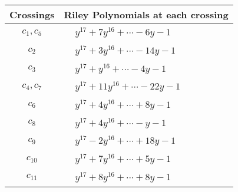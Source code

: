 \documentclass[1p]{elsarticle_modified}
\theoremstyle{definition}
\begin{document}
\begin{tabular}{m{50pt}|m{274pt}}
Crossings & \hspace{64pt}Riley Polynomials at each crossing \\
\hline $$\begin{aligned}c_{1},c_{5}\end{aligned}$$&$\begin{aligned}
&y^{17}+7 y^{16}+\cdots-6 y-1
\end{aligned}$\\
\hline $$\begin{aligned}c_{2}\end{aligned}$$&$\begin{aligned}
&y^{17}+3 y^{16}+\cdots-14 y-1
\end{aligned}$\\
\hline $$\begin{aligned}c_{3}\end{aligned}$$&$\begin{aligned}
&y^{17}+y^{16}+\cdots-4 y-1
\end{aligned}$\\
\hline $$\begin{aligned}c_{4},c_{7}\end{aligned}$$&$\begin{aligned}
&y^{17}+11 y^{16}+\cdots-22 y-1
\end{aligned}$\\
\hline $$\begin{aligned}c_{6}\end{aligned}$$&$\begin{aligned}
&y^{17}+4 y^{16}+\cdots+8 y-1
\end{aligned}$\\
\hline $$\begin{aligned}c_{8}\end{aligned}$$&$\begin{aligned}
&y^{17}+4 y^{16}+\cdots- y-1
\end{aligned}$\\
\hline $$\begin{aligned}c_{9}\end{aligned}$$&$\begin{aligned}
&y^{17}-2 y^{16}+\cdots+18 y-1
\end{aligned}$\\
\hline $$\begin{aligned}c_{10}\end{aligned}$$&$\begin{aligned}
&y^{17}+7 y^{16}+\cdots+5 y-1
\end{aligned}$\\
\hline $$\begin{aligned}c_{11}\end{aligned}$$&$\begin{aligned}
&y^{17}+8 y^{16}+\cdots+8 y-1
\end{aligned}$\\
\hline
\end{tabular}\\~\\
\end{document}
